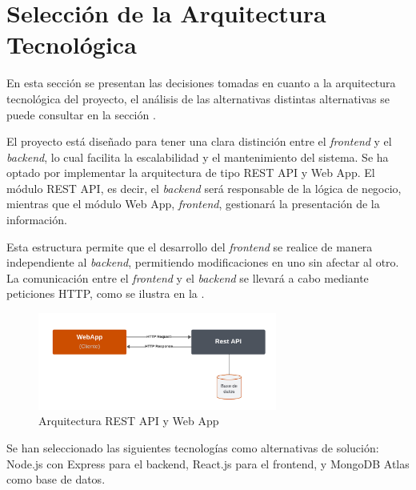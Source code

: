 \section{Selección de la Arquitectura Tecnológica} \label{sec:4_seleccion_arquitectura_tecnologica}
\hypertarget{sec:4_seleccion_arquitectura_tecnologica}{}

En esta sección se presentan las decisiones tomadas en cuanto a la arquitectura tecnológica del proyecto, el análisis de las alternativas distintas alternativas se 
puede consultar en la sección .


El proyecto está diseñado para tener una clara distinción entre el \textit{frontend} y el \textit{backend}, lo cual facilita la escalabilidad y el mantenimiento del sistema. 
Se ha optado por implementar la arquitectura de tipo REST API y Web App. El módulo REST API, es decir, el \textit{backend} será responsable de la lógica de negocio, 
mientras que el módulo Web App, \textit{frontend}, gestionará la presentación de la información. 

Esta estructura permite que el desarrollo del \textit{frontend} se realice de manera independiente al \textit{backend}, permitiendo modificaciones en uno sin afectar al otro. 
La comunicación entre el \textit{frontend} y el \textit{backend} se llevará a cabo mediante peticiones HTTP, como se ilustra en la .


\begin{figure}[H]
    \centering
    \includegraphics[width=0.7\textwidth]{figures/4-Arquitectura-tecnologica/4_REST.png}
    \caption{Arquitectura REST API y Web App}
    \label{fig:arquitectura_rest}
    \hypertarget{fig:arquitectura_rest}{}
\end{figure}


Se han seleccionado las siguientes tecnologías como alternativas de solución: Node.js con Express para el backend, React.js para el frontend, y MongoDB Atlas como base 
de datos.

